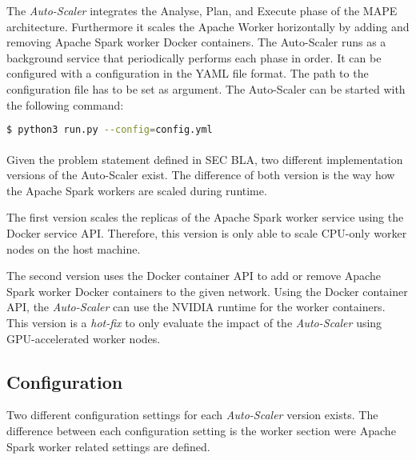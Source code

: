 The \textit{Auto-Scaler} integrates the Analyse, Plan, and Execute phase of the MAPE architecture. Furthermore it scales the Apache Worker horizontally by adding and removing Apache Spark worker Docker containers.
The Auto-Scaler runs as a background service that periodically performs each phase in order.
It can be configured with a configuration in the YAML file format. The path to the configuration file has to be set as argument.
The Auto-Scaler can be started with the following command:
\begin{lstlisting}[label=lst:06_auto-scaler_start, caption=Auto-Scaler start command, language=sh, numbers=none]
$ python3 run.py --config=config.yml
\end{lstlisting}


\paragraph{}
Given the problem statement defined in SEC BLA, two different implementation versions of the Auto-Scaler exist.
The difference of both version is the way how the Apache Spark workers are scaled during runtime.


The first version scales the replicas of the Apache Spark worker service using the Docker service API. Therefore, this version is only able to scale CPU-only worker nodes on the host machine.


The second version uses the Docker container API to add or remove Apache Spark worker Docker containers to the given network. Using the Docker container API, the \textit{Auto-Scaler} can use the NVIDIA runtime for the worker containers. This version is a \textit{hot-fix} to only evaluate the impact of the \textit{Auto-Scaler} using GPU-accelerated worker nodes.


\subsection{Configuration}
Two different configuration settings for each \textit{Auto-Scaler} version exists. The difference between each configuration setting is the worker section were Apache Spark worker related settings are defined.
